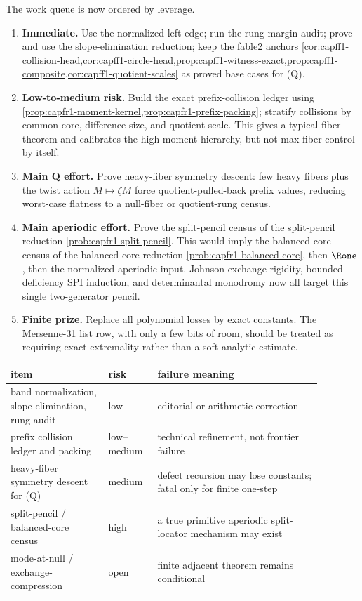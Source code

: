 \documentclass[11pt]{article}
\theoremstyle{definition}
\theoremstyle{remark}
\begin{document}
The work queue is now ordered by leverage.
\begin{enumerate}[label=\textup{(\arabic*)},leftmargin=2.4em]
\item \textbf{Immediate.} Use the normalized left edge; run the rung-margin audit; prove and use the slope-elimination reduction; keep the fable2 anchors \cref{cor:capff1-collision-head,cor:capff1-circle-head,prop:capff1-witness-exact,prop:capff1-composite,cor:capff1-quotient-scales} as proved base cases for \textup{(Q)}.
\item \textbf{Low-to-medium risk.} Build the exact prefix-collision ledger using \cref{prop:capfr1-moment-kernel,prop:capfr1-prefix-packing}; stratify collisions by common core, difference size, and quotient scale.  This gives a typical-fiber theorem and calibrates the high-moment hierarchy, but not max-fiber control by itself.
\item \textbf{Main Q effort.} Prove heavy-fiber symmetry descent: few heavy fibers plus the twist action \(M\mapsto\zeta M\) force quotient-pulled-back prefix values, reducing worst-case flatness to a null-fiber or quotient-rung census.
\item \textbf{Main aperiodic effort.} Prove the split-pencil census of the split-pencil reduction \cref{prob:capfr1-split-pencil}.  This would imply the balanced-core census of the balanced-core reduction \cref{prob:capfr1-balanced-core}, then \(\Rone\), then the normalized aperiodic input.  Johnson-exchange rigidity, bounded-deficiency SPI induction, and determinantal monodromy now all target this single two-generator pencil.
\item \textbf{Finite prize.} Replace all polynomial losses by exact constants.  The Mersenne-31 list row, with only a few bits of room, should be treated as requiring exact extremality rather than a soft analytic estimate.
\end{enumerate}

\begin{center}
\small
\begin{tabular}{|p{0.28\linewidth}|p{0.13\linewidth}|p{0.47\linewidth}|}
\hline
item & risk & failure meaning\\
\hline
band normalization, slope elimination, rung audit & low & editorial or arithmetic correction\\
\hline
prefix collision ledger and packing & low--medium & technical refinement, not frontier failure\\
\hline
heavy-fiber symmetry descent for \textup{(Q)} & medium & defect recursion may lose constants; fatal only for finite one-step\\
\hline
split-pencil / balanced-core census & high & a true primitive aperiodic split-locator mechanism may exist\\
\hline
mode-at-null / exchange-compression & open & finite adjacent theorem remains conditional\\
\hline
\end{tabular}
\end{center}
\end{document}
